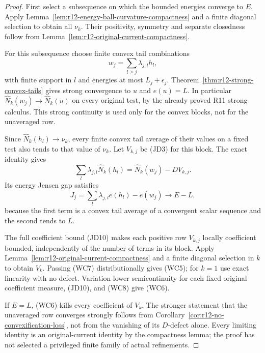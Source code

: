 \documentclass[11pt,a4paper]{article}
\numberwithin{equation}{section}
\theoremstyle{definition}
\theoremstyle{remark}
\begin{document}
\begin{proof}
First select a subsequence on which the bounded energies converge
to $E$.  Apply Lemma~\ref{lem:r12-energy-ball-curvature-compactness}
and a finite diagonal selection to obtain all $\nu_k$.  Their
positivity, symmetry and separate closedness follow from
Lemma~\ref{lem:r12-original-current-compactness}.

For this subsequence choose finite convex tail combinations
\[
                 w_j=\sum_{l\geq j}\lambda_{j,l}h_l,
\]
with finite support in $l$ and energies at most $L_j+\epsilon_j$.
Theorem~\ref{thm:r12-strong-convex-tails} gives strong convergence
to $u$ and $e(u)=L$.  In particular
$\widehat N_k(w_j)\to\widehat N_k(u)$ on every original test,
by the already proved R11 strong calculus.  This strong continuity
is used only for the convex blocks, not for the unaveraged row.

Since $\widehat N_k(h_l)\to\nu_k$, every finite convex tail average
of their values on a fixed test also tends to that value of $\nu_k$.
Let $V_{k,j}$ be (JD3) for this block.  The exact identity gives
\[
 \sum_l\lambda_{j,l}\widehat N_k(h_l)
                   =\widehat N_k(w_j)-DV_{k,j}.
 \tag{WC7}
\]
Its energy Jensen gap satisfies
\[
 J_j=\sum_l\lambda_{j,l}e(h_l)-e(w_j)
                       \longrightarrow E-L,
 \tag{WC8}
\]
because the first term is a convex tail average of a convergent
scalar sequence and the second tends to $L$.

The full coefficient bound (JD10) makes each positive row
$V_{k,j}$ locally coefficient bounded, independently of the number
of terms in its block.  Apply
Lemma~\ref{lem:r12-original-current-compactness} and a finite
diagonal selection in $k$ to obtain $V_k$.  Passing (WC7)
distributionally gives (WC5); for $k=1$ use exact linearity with
no defect.  Variation lower semicontinuity for each fixed original
coefficient measure, (JD10), and (WC8) give (WC6).

If $E=L$, (WC6) kills every coefficient of $V_k$.  The stronger
statement that the unaveraged row converges strongly follows from
Corollary~\ref{cor:r12-no-convexification-loss}, not from the
vanishing of its $D$-defect alone.  Every limiting identity is an
original-current identity by the compactness lemma; the proof has
not selected a privileged finite family of actual refinements.
\end{proof}
\end{document}
